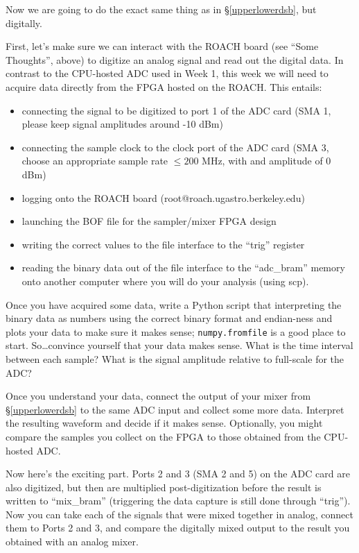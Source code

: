 \documentclass[11pt]{article}
\begin{document}
Now we are going to do the exact same thing as in \S\ref{upperlowerdsb}, but digitally.

First, let's make sure we can interact with the ROACH board (see ``Some Thoughts'', above)
to digitize an analog signal and read out the digital data.  In contrast to the CPU-hosted ADC
used in Week 1, this week we will need to acquire data directly from the FPGA hosted on the ROACH.
This entails:
\begin{itemize}[noitemsep,nolistsep]
\item connecting the signal to be digitized to port 1 of the ADC card (SMA 1, please keep signal amplitudes around -10 dBm)
\item connecting the sample clock to the clock port of the ADC card (SMA 3, choose an appropriate sample rate $\le200$ MHz, with
    and amplitude of 0 dBm)
\item logging onto the ROACH board (root@roach.ugastro.berkeley.edu)
\item launching the BOF file for the sampler/mixer FPGA design
\item writing the correct values to the file interface to the ``trig'' register
\item reading the binary data out of the file interface to the ``adc\_bram'' memory onto another computer
where you will do your analysis (using scp).
\end{itemize}

Once you have acquired some data, write a Python script that
interpreting the binary data as numbers using the correct binary format and endian-ness
and plots your data to make sure it makes sense; \verb+numpy.fromfile+ is a good place to start.  
So\dots convince yourself that your data
makes sense.  What is the time interval between each sample?  What is the signal amplitude
relative to full-scale for the ADC?

Once you understand your data, connect the output of your mixer from \S\ref{upperlowerdsb} to
the same ADC input and collect some more data.  Interpret the resulting waveform and decide if
it makes sense. Optionally, you might compare the samples you collect on the FPGA to those obtained from the CPU-hosted
ADC.  

Now here's the exciting part.  Ports 2 and 3 (SMA 2 and 5) on the ADC card are also digitized, but then are multiplied
post-digitization before the result is written to ``mix\_bram'' (triggering the data capture is still
done through ``trig'').  Now you can take each of the signals
that were mixed together in analog, connect them to Ports 2 and 3, and compare the digitally mixed output
to the result you obtained with an analog mixer.
\end{document}
